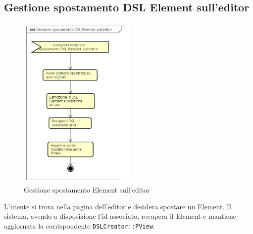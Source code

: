     \subsection{Gestione spostamento DSL Element sull'editor}
    \begin{figure}[H]
      \centering
      \includegraphics[width=0.5\textwidth]{res/img/spostamentoDSLElement.png}
      \caption{Gestione spostamento  Element sull'editor}
      \label{fig:diagram_model}
    \end{figure}
    L'utente si trova nella pagina dell'editor e desidera spostare un  Element. Il sistema, avendo a disposizione l'id associato, recupera il  Element e mantiene aggiornata la corrispondente \texttt{DSLCreator::PView}.
